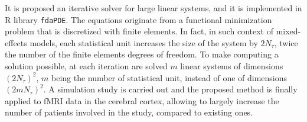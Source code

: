 
It is proposed an iterative solver for large linear systems, and it 
is implemented in R library \texttt{fdaPDE}.
The equations originate from a functional minimization problem
that is discretized with finite elements. In fact,
in such context of mixed-effects models,
each statistical unit increases the size of the system by $2 N_{\tau}$, twice the number of
the finite elements degrees of freedom.\newline
To make computing a solution possible, at each iteration are solved 
$m$ linear systems of dimensions $\left(2 N_{\tau}\right)^2$,
$m$ being the number of statistical unit, instead of one of
dimensions $\left(2m N_{\tau}\right)^2$.\newline
A simulation study is carried out and the proposed
method is finally applied to fMRI data in the cerebral cortex,
allowing to largely increase the number of patients involved in
the study, compared to existing ones.
